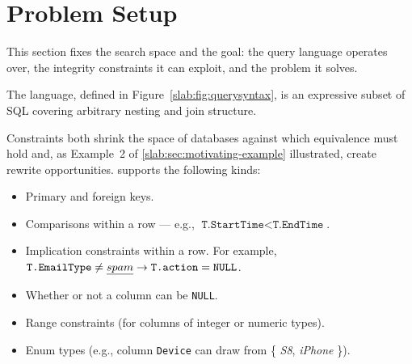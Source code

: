 \section{Problem Setup}
\label{slab:sec:problem}

This section fixes the search space and the goal: the query language
\toolname operates over, the integrity constraints it can exploit, and
the problem it solves.


The language, defined in Figure~\ref{slab:fig:querysyntax}, is an
expressive subset of SQL covering arbitrary nesting and join
structure.




Constraints both shrink the space of databases against which
equivalence must hold and, as Example~2 of
\cref{slab:sec:motivating-example} illustrated, create rewrite
opportunities. \slabcity supports the following kinds:
\begin{itemize}[leftmargin=*]
\item 
Primary and foreign keys. 
\item 
Comparisons within a row --- e.g.,  $\texttt{T.StartTime} < \texttt{T.EndTime}$. 
\item 
Implication constraints within a row. For example, $\texttt{T.EmailType} \neq \emph{spam} \rightarrow \texttt{T.action} = \texttt{NULL}$. 
\item 
Whether or not a column can be \texttt{NULL}. 
\item 
Range constraints (for columns of integer or numeric types).
\item 
Enum types (e.g., column \texttt{Device} can draw from \{ \emph{S8}, \emph{iPhone} \}).
\end{itemize}

